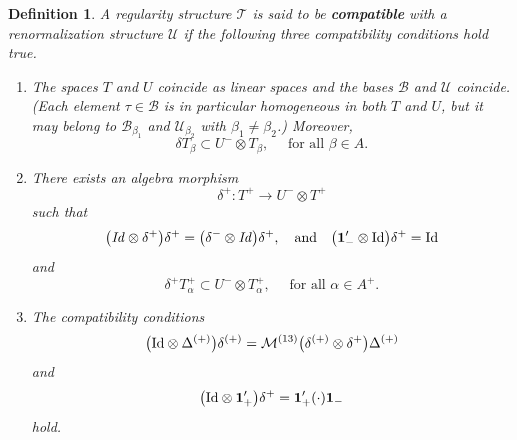 \documentclass[10pt, reqno]{amsart}
\numberwithin{subsection}{section}
\numberwithin{subsubsection}{subsection}
\numberwithin{equation}{section} %
\theoremstyle{mystyle}
\newtheorem{defn}[thm]{ \hspace{-0.31cm} {Definition}}%
\theoremstyle{mystyle2}
\theoremstyle{mystyle3}
\newcommand{\iden}{\text{\rm Id}}
\newcommand{\mcB}{\mathcal{B}}
\newcommand{\mcM}{\mathcal{M}}
\newcommand\mcU{\mathcal U}
\begin{document}
\begin{defn}   \label{*DefnCompatibility}
A regularity structure $\mathscr{T}$ is said to be \textbf{\textsf{compatible}} with a   renormalization structure $\mathscr{U}$ if the following three compatibility conditions hold true.
\begin{enumerate}
\setlength{\itemsep}{0.5cm}

   \item[\textsf{\textbf{(a)}}] 
The spaces $T$ and $U$ coincide as linear spaces and the bases $\mcB$ and 
$\mcU$ coincide. (Each element $\tau\in\mcB$ is in particular homogeneous 
in both $T$ and $U$, but it may belong to $\mcB_{\beta_1}$ and $\mcU_{\beta_2}$ with $\beta_1\neq\beta_2$.) Moreover,
\begin{equation}   \label{delta T to U-T}
\delta T_\beta \subset U^-\otimes T_\beta,\quad \textrm{ for all }\beta\in A.
\end{equation}   
   
   \item[\textsf{\textbf{(b)}}] There exists an algebra morphism 
$$
\delta^+:T^+\to U^-\otimes T^+
$$ 
such that
\begin{equation} \label{T+ is a comodule over U^-}
\big(\textrm{\emph{Id}}\otimes\delta^+\big)\delta^+ = \big(\delta^-\otimes\textrm{\emph{Id}}\big)\delta^+,\quad\textrm{and}\quad
\big({\bf1}_-'\otimes\iden\big)\delta^+ = \iden
\end{equation}
and
\begin{equation}   \label{delta+ T+ to U-T+}
\delta^+ T_\alpha^+ \subset U^-\otimes T_\alpha^+, \quad \textrm{ for all 
}\alpha\in A^+.
\end{equation}   
   
   \item[\textsf{\textbf{(c)}}]  The compatibility conditions
\begin{align}\label{*EqCompatibilityCondition}
\big(\iden \otimes \Delta^{(+)}\big)\delta^{(+)} = \mcM^{(13)}\big(\delta^{(+)}\otimes\delta^+\big)\Delta^{(+)}
\end{align}
and
\begin{align}\label{*EqCompatibilityCondition2}
\big(\iden\otimes{\bf1}_+'\big)\delta^+={\bf1}_+'(\cdot){\bf1}_-
\end{align}
hold.
\end{enumerate}
\end{defn} 

\medskip
\end{document}
